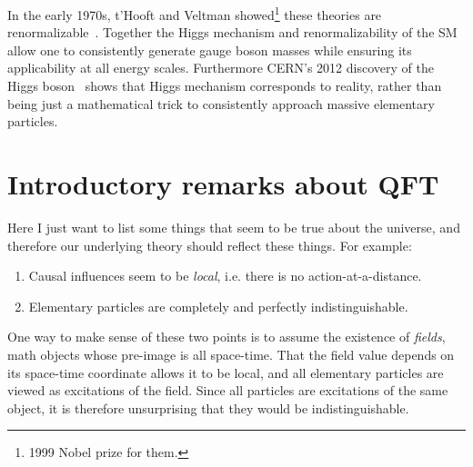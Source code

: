 In the early 1970s, t'Hooft and Veltman
showed\footnote{1999 Nobel prize for them.} these theories are
renormalizable~\cite{t_hooft_regularization_1972}. Together the Higgs mechanism
and renormalizability of the SM allow one to consistently generate gauge boson
masses while ensuring its applicability at all energy scales.
Furthermore CERN's 2012 discovery of the Higgs 
boson~\cite{aad_observation_2012,chatrchyan_observation_2012} shows that Higgs mechanism
corresponds to reality, rather than being just a mathematical trick to 
consistently approach massive elementary particles.



\section{Introductory remarks about QFT} 

Here I just want to list some things that seem to be true about the universe,
and therefore our underlying theory should reflect these things. For example:
\begin{enumerate}
  \item Causal influences seem to be {\it local}, i.e. there is no
        action-at-a-distance.
  \item Elementary particles are completely and perfectly indistinguishable.
\end{enumerate}
One way to make sense of these two points is to assume the existence of 
{\it fields}, math objects whose pre-image is all space-time.
That the field value depends on its space-time coordinate allows it to be local,
and all elementary particles are viewed as excitations of the field. Since all
particles are excitations of the same object, it is therefore unsurprising that
they would be indistinguishable.

